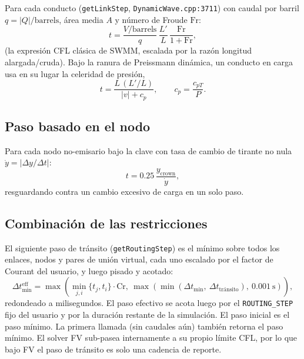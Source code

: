 \documentclass[11pt,a4paper]{article}
\newcommand{\st}{\mathrm{s}}
\begin{document}
Para cada conducto (\texttt{getLinkStep}, \texttt{Dynamic\-Wave.cpp:3711})
con caudal por barril $q = \lvert Q \rvert/\mathrm{barrels}$, área media $A$ y
número de Froude $\mathrm{Fr}$:
\begin{equation}
  t = \frac{V/\mathrm{barrels}}{q}\,
      \frac{L'}{L}\,\frac{\mathrm{Fr}}{1 + \mathrm{Fr}},
\end{equation}
(la expresión CFL clásica de SWMM, escalada por la razón longitud
alargada/cruda). Bajo la ranura de Preissmann dinámica, un conducto en carga
usa en su lugar la celeridad de presión,
\begin{equation}
  t = \frac{L\,(L'/L)}{\lvert v \rvert + c_p}, \qquad
  c_p = \frac{c_{pT}}{P}.
\end{equation}

\subsection{Paso basado en el nodo}

Para cada nodo no-emisario bajo la clave con tasa de cambio de tirante no nula
$\dot y = \lvert \Delta y/\Delta t \rvert$:
\begin{equation}
  t = 0.25\,\frac{y_{\mathrm{crown}}}{\dot y},
\end{equation}
resguardando contra un cambio excesivo de carga en un solo paso.

\subsection{Combinación de las restricciones}

El siguiente paso de tránsito (\texttt{getRoutingStep}) es el mínimo sobre
todos los enlaces, nodos y pares de unión virtual, cada uno escalado por el
factor de Courant del usuario, y luego pisado y acotado:
\begin{equation}
  \Delta t_{\min}^{\mathrm{eff}} =
    \max\!\left(\min_{j,i}\{t_j, t_i\}\cdot \mathrm{Cr},\
      \max(\min(\Delta t_{\min},\ \Delta t_{\text{tránsito}}),\
      0.001\ \st)\right),
\end{equation}
redondeado a milisegundos. El paso efectivo se acota luego por el
\texttt{ROUTING\_STEP} fijo del usuario y por la duración restante de la
simulación. El paso inicial es el paso mínimo. La primera llamada (sin caudales
aún) también retorna el paso mínimo. El solver FV sub-pasea internamente a su
propio límite CFL, por lo que bajo FV el paso de tránsito es solo una cadencia
de reporte.
\end{document}
